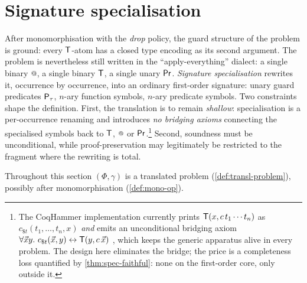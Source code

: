 \section{Signature specialisation}
\label{sec:specialization}

After monomorphisation with the \emph{drop} policy, the guard
structure of the problem is ground: every $\mathsf{T}$-atom has a
closed type encoding as its second argument.  The problem is
nevertheless still written in the ``apply-everything'' dialect: a
single binary $\app$, a single binary $\mathsf{T}$, a single unary
$\mathsf{Pr}$.  \emph{Signature specialisation} rewrites it, occurrence by
occurrence, into an ordinary first-order signature: unary guard
predicates $\mathsf{P}_{\tau}$, $n$-ary function symbols, $n$-ary
predicate symbols.  Two constraints shape the definition.  First,
the translation is to remain \emph{shallow}: specialisation is a
per-occurrence renaming and introduces \emph{no bridging axioms}
connecting the specialised symbols back to $\mathsf{T}$, $\app$ or
$\mathsf{Pr}$.\footnote{The CoqHammer implementation currently prints
$\mathsf{T}(x, c\,t_1 \cdots t_n)$ as $c_{\$t}(t_1, \ldots, t_n, x)$
\emph{and} emits an unconditional bridging axiom $\forall \vec{x}
y.\ c_{\$t}(\vec{x}, y) \leftrightarrow \mathsf{T}(y, c\,\vec{x})$
\cite[\S5.5]{CzajkaKaliszyk2018}, which keeps the generic apparatus
alive in every problem.  The design here eliminates the bridge; the
price is a completeness loss quantified by
\cref{thm:spec-faithful}: none on the first-order core, only outside
it.}  Second, soundness must be unconditional, while
proof-preservation may legitimately be restricted to the fragment
where the rewriting is total.

Throughout this section $(\Phi, \gamma)$ is a translated problem
(\cref{def:transl-problem}), possibly after monomorphisation
(\cref{def:mono-op}).

